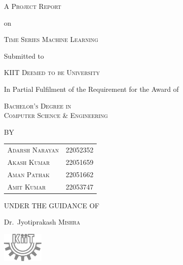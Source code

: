 \begin{titlepage}
	\centering
	\vfill %
	
	{\Large \textsc{A Project Report}\par}
	\vspace{0.5cm}
	{\normalsize on\par}
	\vspace{0.5cm}
	{\huge \textsc{Time Series Machine Learning}\par} %
	\vspace{1cm}
	{\normalsize Submitted to\par}
	\vspace{0.5cm}
	{\Large \textsc{KIIT Deemed to be University}\par}
	\vspace{1cm}
	{\normalsize In Partial Fulfilment of the Requirement for the Award of\par}
	\vspace{0.5cm}
	{\Large \textsc{Bachelor's Degree in \\ Computer Science \& Engineering}\par}
	\vspace{1cm}
	{\normalsize BY\par}
	\vspace{0.5cm}
	\begin{tabular}{ll}
		\textsc{Adarsh Narayan} & \textsc{22052352} \\
		\textsc{Akash Kumar}    & \textsc{22051659} \\
		\textsc{Aman Pathak}    & \textsc{22051662} \\
		\textsc{Amit Kumar}     & \textsc{22053747} \\
	\end{tabular}
	\par
	\vspace{0.5cm}
	{\normalsize UNDER THE GUIDANCE OF\par}
	\vspace{0.5cm}
	{\normalsize Dr.~Jyotiprakash \textsc{Mishra}\par}
	
	\vfill %
	
	\includegraphics[width=0.15\textwidth]{./assets/bw_kiit.png}\par %
\end{titlepage}
